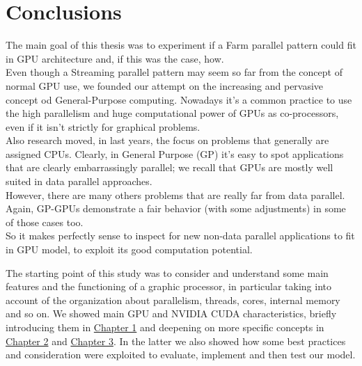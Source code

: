 \chapter{Conclusions} \label{chap:conclusions}
The main goal of this thesis was to experiment if a Farm parallel pattern could fit in GPU architecture and, if this was the case, how.\\
Even though a Streaming parallel pattern may seem so far from the concept of normal GPU use, we founded our attempt on the increasing and pervasive concept od General-Purpose computing.
Nowadays it's a common practice to use the high parallelism and huge computational power of GPUs as co-processors, even if it isn't strictly for graphical problems.\\
Also research moved, in last years, the focus on problems that generally are assigned CPUs. Clearly, in General Purpose (GP) it's easy to spot applications that are clearly embarrassingly parallel; we recall that GPUs are mostly well suited in data parallel approaches.\\
However, there are many others problems that are really far from data parallel. Again, GP-GPUs demonstrate a fair behavior (with some adjustments) in some of those cases too.\\
So it makes perfectly sense to inspect for new non-data parallel applications to fit in GPU model, to exploit its good computation potential.

The starting point of this study was to consider and understand some main features and the functioning of a graphic processor, in particular taking into account of the organization about parallelism, threads, cores, internal memory and so on. We showed main GPU and NVIDIA CUDA characteristics, briefly introducing them in \hyperref[chap:into]{Chapter 1} and deepening on more specific concepts in \hyperref[chap:tools]{Chapter 2} and \hyperref[chap:logic]{Chapter 3}. In the latter we also showed how some best practices and consideration were exploited to evaluate, implement and then test our model. \\




